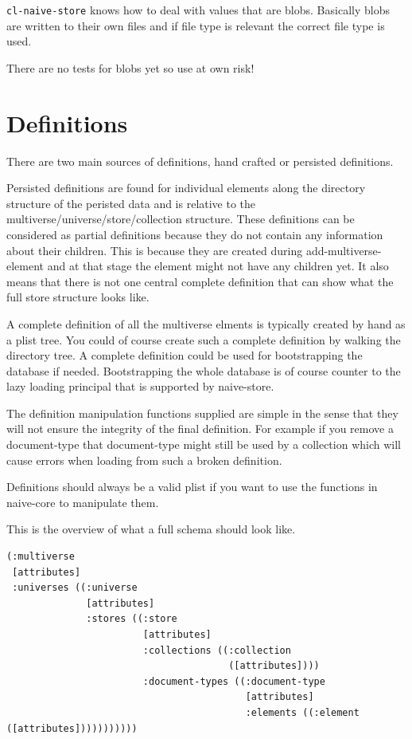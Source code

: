\documentclass[11pt]{article}
\begin{document}
\texttt{cl-naive-store} knows how to deal with values that are blobs. Basically
blobs are written to their own files and if file type is relevant the
correct file type is used.

There are no tests for blobs yet so use at own risk!

\section{Definitions}
\label{sec:orgeb209d9}

There are two main sources of definitions, hand crafted or persisted
definitions.

Persisted definitions are found for individual elements along the
directory structure of the peristed data and is relative to the
multiverse/universe/store/collection structure. These definitions can
be considered as partial definitions because they do not contain any
information about their children. This is because they are created
during add-multiverse-element and at that stage the element might not
have any children yet. It also means that there is not one central
complete definition that can show what the full store structure
looks like.

A complete definition of all the multiverse elments is typically
created by hand as a plist tree. You could of course create such a
complete definition by walking the directory tree. A complete
definition could be used for bootstrapping the database if
needed. Bootstrapping the whole database is of course counter to the
lazy loading principal that is supported by naive-store.

The definition manipulation functions supplied are simple in the sense
that they will not ensure the integrity of the final definition. For
example if you remove a document-type that document-type might still
be used by a collection which will cause errors when loading from such
a broken definition.

Definitions should always be a valid plist if you want to use the
functions in naive-core to manipulate them.

This is the overview of what a full schema should look like.

\begin{verbatim}
(:multiverse
 [attributes]
 :universes ((:universe
              [attributes]
              :stores ((:store
                        [attributes]
                        :collections ((:collection
                                       ([attributes])))
                        :document-types ((:document-type
                                          [attributes]
                                          :elements ((:element ([attributes]))))))))))
\end{verbatim}
\end{document}
